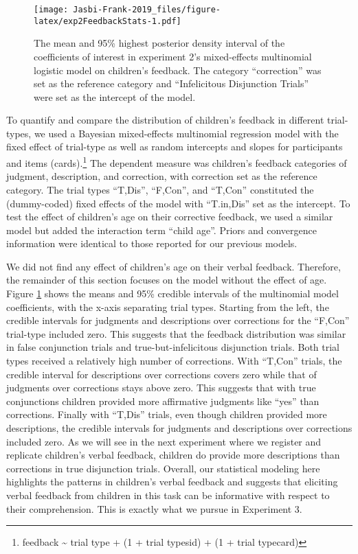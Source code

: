 \documentclass[,man,floatsintext]{apa6}
\let\rmarkdownfootnote\footnote%
\def\footnote{\protect\rmarkdownfootnote}
\begin{document}
\begin{figure}
\centering
\texttt{[image: Jasbi-Frank-2019\_files/figure-latex/exp2FeedbackStats-1.pdf]}
\caption{\label{fig:exp2FeedbackStats}The mean and 95\% highest posterior density interval of the coefficients of interest in experiment 2's mixed-effects multinomial logistic model on children's feedback. The category \enquote{correction} was set as the reference category and \enquote{Infelicitous Disjunction Trials} were set as the intercept of the model.}
\end{figure}

To quantify and compare the distribution of children's feedback in different trial-types, we used a Bayesian mixed-effects multinomial regression model with the fixed effect of trial-type as well as random intercepts and slopes for participants and items (cards).\footnote{feedback \textasciitilde{} trial type + (1 + trial type\textbar{}sid) + (1 + trial type\textbar{}card)} The dependent measure was children's feedback categories of judgment, description, and correction, with correction set as the reference category. The trial types \enquote{T,Dis}, \enquote{F,Con}, and \enquote{T,Con} constituted the (dummy-coded) fixed effects of the model with \enquote{T.in,Dis} set as the intercept. To test the effect of children's age on their corrective feedback, we used a similar model but added the interaction term \enquote{child age}. Priors and convergence information were identical to those reported for our previous models.

We did not find any effect of children's age on their verbal feedback. Therefore, the remainder of this section focuses on the model without the effect of age. Figure \ref{fig:exp2FeedbackStats} shows the means and 95\% credible intervals of the multinomial model coefficients, with the x-axis separating trial types. Starting from the left, the credible intervals for judgments and descriptions over corrections for the \enquote{F,Con} trial-type included zero. This suggests that the feedback distribution was similar in false conjunction trials and true-but-infelicitous disjunction trials. Both trial types received a relatively high number of corrections. With \enquote{T,Con} trials, the credible interval for descriptions over corrections covers zero while that of judgments over corrections stays above zero. This suggests that with true conjunctions children provided more affirmative judgments like \enquote{yes} than corrections. Finally with \enquote{T,Dis} trials, even though children provided more descriptions, the credible intervals for judgments and descriptions over corrections included zero. As we will see in the next experiment where we register and replicate children's verbal feedback, children do provide more descriptions than corrections in true disjunction trials. Overall, our statistical modeling here highlights the patterns in children's verbal feedback and suggests that eliciting verbal feedback from children in this task can be informative with respect to their comprehension. This is exactly what we pursue in Experiment 3.
\end{document}
